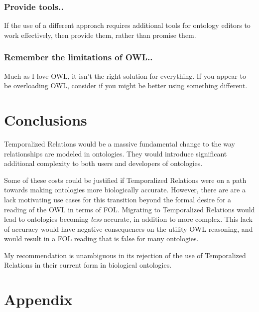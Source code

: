 \documentclass{bioinfo}
\begin{document}
\subsubsection{Provide tools..} If the use of a different approach
requires additional tools for ontology editors to work effectively,
then provide them, rather than promise them.

\subsubsection{Remember the limitations of OWL..} Much as I love OWL,
it isn't the right solution for everything. If you appear to be
overloading OWL, consider if you might be better using something
different.

\section{Conclusions}

Temporalized Relations would be a massive fundamental change to the
way relationships are modeled in ontologies. They would introduce
significant additional complexity to both users and developers of
ontologies.

Some of these costs could be justified if Temporalized Relations were
on a path towards making ontologies more biologically
accurate. However, there are are a lack motivating use cases for this
transition beyond the formal desire for a reading of the OWL in terms
of FOL. Migrating to Temporalized Relations would lead to ontologies
becoming \emph{less} accurate, in addition to more complex. This lack
of accuracy would have negative consequences on the utility OWL
reasoning, and would result in a FOL reading that is false for many
ontologies.

My recommendation is unambiguous in its rejection of the use of
Temporalized Relations in their current form in biological ontologies.





\newpage
\section*{Appendix}
\end{document}
